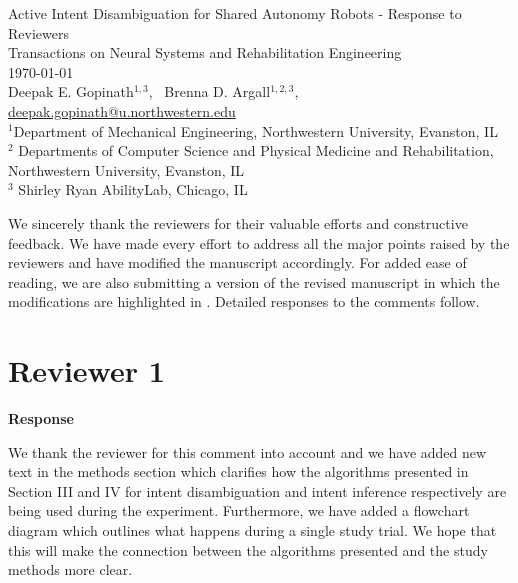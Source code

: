 \documentclass[a4paper,twoside,11pt]{reviewresponse}
\makeatletter
\newcommand{\myAuthors}{{Deepak E. Gopinath$^{\displaystyle 1, 3}$, ~Brenna D. Argall$^{\displaystyle 1,2,3}$, }}
\newcommand{\myEmail}{deepak.gopinath@u.northwestern.edu}
\newcommand{\myTitle}{Active Intent Disambiguation for Shared Autonomy Robots - Response to Reviewers}
\newcommand{\myJournal}{Transactions on Neural Systems and Rehabilitation Engineering}
\newcommand{\myDept}{{$^{\displaystyle 1}$Department of Mechanical Engineering, Northwestern University, Evanston, IL}\\
{$^{\displaystyle 2}$ Departments of Computer Science and Physical Medicine and Rehabilitation, Northwestern University, Evanston, IL  }\\
{$^{\displaystyle 3}$ Shirley Ryan AbilityLab, Chicago, IL }\\}
\makeatother
\begin{document}
\thispagestyle{plain}

\begin{center}
 {\LARGE\myTitle} \vspace{0.5cm} \\
 {\large\myJournal} \vspace{0.5cm} \\
 \today \vspace{0.5cm} \\
 \myAuthors \\
 \url{\myEmail} \vspace{1cm} \\
 \myDept
\end{center}


We sincerely thank the reviewers for their valuable efforts and constructive feedback. We have made every effort to address all the major points raised by the reviewers and have modified the manuscript accordingly. For added ease of reading, we are also submitting a version of the revised manuscript in which the modifications are highlighted in . Detailed responses to the comments follow.  

\section{Reviewer 1}


\textbf{Response}

We thank the reviewer for this comment into account and we have added new text in the methods section which clarifies how the algorithms presented in Section III and IV for intent disambiguation and intent inference respectively are being used during the experiment. Furthermore, we have added a flowchart diagram which outlines what happens during a single study trial. We hope that this will make the connection between the algorithms presented and the study methods more clear.
\end{document}
